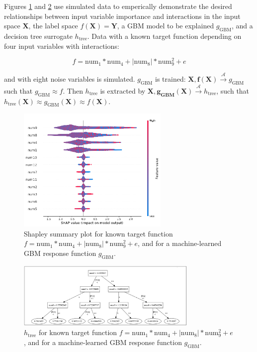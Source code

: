 \documentclass{article}
\begin{document}
Figures \ref{fig:global_shapley} and \ref{fig:dt_surrogate} use simulated data to emperically demonstrate the desired relationships between input variable importance and interactions in the input space $\mathbf{X}$, the label space $f(\mathbf{X}) = \mathbf{Y}$, a GBM model to be explained $g_{\text{GBM}}$, and a decision tree surrogate $h_{\text{tree}}$. Data with a known target function depending on four input variables with interactions: 

\begin{equation}
f = \text{num} _1 * \text{num}_4 + |\text{num}_8| * \text{num}_9^2 + e
\end{equation}

and with eight noise variables is simulated. $g_{\text{GBM}}$ is trained: $ \mathbf{X}, \mathbf{f(X)} \xrightarrow{\mathcal{A}} g_{\text{GBM}}$ such that $g_{\text{GBM}} \approx f$. Then $h_{\text{tree}}$ is extracted by $\mathbf{X}, \mathbf{g_{\text{GBM}}(X)} \xrightarrow{\mathcal{A}} h_{\text{tree}}$, such that $h_{\text{tree}}(\mathbf{X}) \approx g_{\text{GBM}}(\mathbf{X}) \approx f(\mathbf{X})$.

\begin{figure}[htb]
	\begin{center}
		\includegraphics[height=170pt]{img/global_shapley.png}
		\caption{Shapley summary plot for known target function $f = \text{num} _1 * \text{num}_4 + |\text{num}_8| * \text{num}_9^2 + e$, and for a machine-learned GBM response function $g_{\text{GBM}}$.}
		\label{fig:global_shapley}
	\end{center}
\end{figure}

\begin{figure}[htb]
	\begin{center}
		\includegraphics[height=90pt]{img/dt_surrogate2.png}
		\caption{$h_{\text{tree}}$ for known target function $f = \text{num} _1 * \text{num}_4 + |\text{num}_8| * \text{num}_9^2 + e$, and for a machine-learned GBM response function $g_{\text{GBM}}$.}
		\label{fig:dt_surrogate}
	\end{center}
\end{figure}
\end{document}
